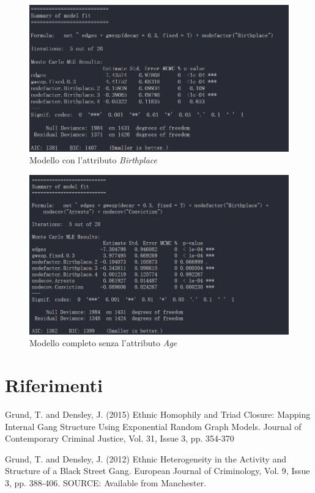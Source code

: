 \documentclass[11pt,a4paper]{report}
\begin{document}
\begin{figure}
	\centering
	\includegraphics[scale =0.7]{modcov4}
	\caption{Modello con l'attributo \emph{Birthplace} }
\end{figure}

\begin{figure}
	\centering
	\includegraphics[scale =0.7]{mod5}
	\caption{Modello completo senza l'attributo \emph{Age} }
\end{figure}


\chapter*{Riferimenti}
Grund, T. and Densley, J. (2015) Ethnic Homophily and Triad Closure: Mapping Internal Gang Structure Using Exponential Random Graph Models. Journal of Contemporary Criminal Justice, Vol. 31, Issue 3, pp. 354-370

Grund, T. and Densley, J. (2012) Ethnic Heterogeneity in the Activity and Structure of a Black Street Gang. European Journal of Criminology, Vol. 9, Issue 3, pp. 388-406.
SOURCE: Available from Manchester.
\end{document}
